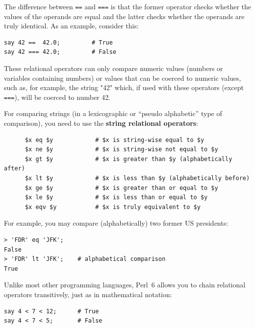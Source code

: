 The difference between {\tt ==} and {\tt ===} is that the 
former operator checks whether the values of the operands 
are equal and the latter checks whether the operands are 
truly identical. As an example, consider this:

\begin{verbatim}
say 42 ==  42.0;         # True
say 42 === 42.0;         # False
\end{verbatim}
%


These relational operators can only compare numeric values
(numbers or variables containing numbers) or values that 
can be coerced to numeric values, such as, for example, 
the string "42" which, if used with these operators 
(except {\tt ===}), will be coerced to number 42.

For comparing strings (in a lexicographic or ``pseudo 
alphabetic'' type of comparison), you need to use 
the {\bf string relational operators}:

\begin{verbatim}
      $x eq $y            # $x is string-wise equal to $y
      $x ne $y            # $x is string-wise not equal to $y
      $x gt $y            # $x is greater than $y (alphabetically after)
      $x lt $y            # $x is less than $y (alphabetically before)
      $x ge $y            # $x is greater than or equal to $y
      $x le $y            # $x is less than or equal to $y
      $x eqv $y           # $x is truly equivalent to $y
\end{verbatim}
%  



For example, you may compare (alphabetically) two former 
US presidents:
\begin{verbatim}
> 'FDR' eq 'JFK';
False
> 'FDR' lt 'JFK';    # alphabetical comparison
True
\end{verbatim}
%  

Unlike most other programming languages, Perl~6 allows you to chain relational operators transitively, just as in mathematical notation:

\begin{verbatim}
say 4 < 7 < 12;      # True
say 4 < 7 < 5;       # False
\end{verbatim}

